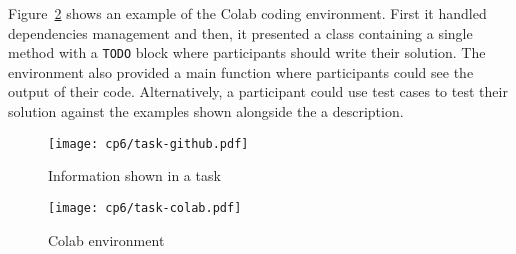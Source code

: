 Figure~\ref{fig:nytimes-task-colab} shows an example of the Colab coding environment. 
First it handled dependencies management and then, 
it presented a class containing a single method with a \texttt{TODO} block where 
participants should write their solution. 
The environment also provided a main function where participants could see the output
of their code. Alternatively, a participant could use test cases to test their solution
against the examples shown alongside the a description.





\clearpage

\begin{figure}
    \centering
    \texttt{[image: cp6/task-github.pdf]}
    \caption{Information shown in a task}
    \label{fig:nytimes-task-github}
\end{figure}



\clearpage

\begin{figure}
    \centering
    \texttt{[image: cp6/task-colab.pdf]}
    \caption{Colab environment}
    \label{fig:nytimes-task-colab}
\end{figure}



\clearpage



